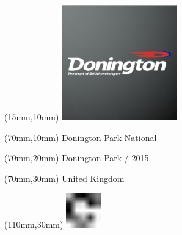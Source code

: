 \null\newpage
\begin{textblock*}{50mm}(15mm,10mm)%
\includegraphics[width=50mm]{LG/2015-05-20_00080.png}
\end{textblock*}
\begin{textblock*}{130mm}(70mm,10mm)%
{\fontsize{20}{20}\selectfont Donington Park National}\\
\end{textblock*}
\begin{textblock*}{120mm}(70mm,20mm)%
{\fontsize{16}{16}\selectfont Donington Park / 2015}\\
\end{textblock*}
\begin{textblock*}{120mm}(70mm,30mm)%
{\fontsize{12}{12}\selectfont United Kingdom}
\end{textblock*}
\begin{textblock*}{30mm}(110mm,30mm)%
\centering
\includegraphics[height=15mm]{icons/fa-rotate-right.pdf}
\end{textblock*}
